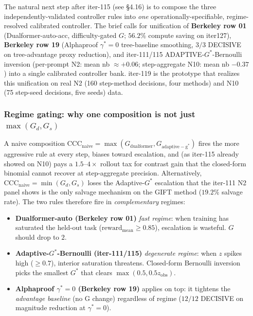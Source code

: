 \label{sec:p7-calibrated-controller-unification}

The natural next step after iter-115 (see §4.16) is to compose the
three independently-validated controller rules into \emph{one}
operationally-specifiable, regime-resolved calibrated controller.
The brief calls for unification of \textbf{Berkeley row 01}
(Dualformer-auto-acc, difficulty-gated $G$; $56.2\%$ compute saving
on iter127), \textbf{Berkeley row 19} (Alphaproof $\gamma^*=0$
tree-baseline smoothing, $3/3$ DECISIVE on tree-advantage proxy
reduction), and iter-111/115 ADAPTIVE-$G^*$-Bernoulli inversion
(per-prompt N2: mean nb $\approx+0.06$; step-aggregate N10: mean nb
$-0.37$) into a single calibrated controller bank. iter-119 is the
prototype that realizes this unification on real N2 (160 step-method
decisions, four methods) and N10 (75 step-seed decisions, five seeds)
data.

\subsubsection*{Regime gating: why one composition is not just $\max(G_d,G_s)$}

A naive composition $\mathrm{CCC}_{\mathrm{naive}}=\max(G_{\mathrm{dualformer}},
G_{\mathrm{adaptive-g^*}})$ fires the more aggressive rule at every
step, biases toward escalation, and (as iter-115 already showed on
N10) pays a $1.5$--$4\times$ rollout tax for contrast gain that the
closed-form binomial cannot recover at step-aggregate precision.
Alternatively, $\mathrm{CCC}_{\mathrm{naive}}=\min(G_d,G_s)$ loses the
Adaptive-$G^*$ escalation that the iter-111 N2 panel shows is the only
salvage mechanism on the GIFT method ($19.2\%$ salvage rate). The
two rules therefore fire in \emph{complementary} regimes:

\begin{itemize}
\item \textbf{Dualformer-auto (Berkeley row 01)} \emph{fast regime}: when
  training has saturated the held-out task ($\mathrm{reward}_{\mathrm{mean}}
  \geq 0.85$), escalation is wasteful. $G$ should drop to $2$.
\item \textbf{Adaptive-$G^*$-Bernoulli (iter-111/115)} \emph{degenerate regime}:
  when $z$ spikes high ($\geq 0.7$), interior saturation threatens.
  Closed-form Bernoulli inversion picks the smallest $G^*$ that clears
  $\max(0.5, 0.5 z_{\mathrm{obs}})$.
\item \textbf{Alphaproof $\gamma^*=0$ (Berkeley row 19)} applies on top:
  it tightens the \emph{advantage baseline} (no G change)
  regardless of regime ($12/12$ DECISIVE on magnitude reduction at
  $\gamma^*=0$).
\end{itemize}

